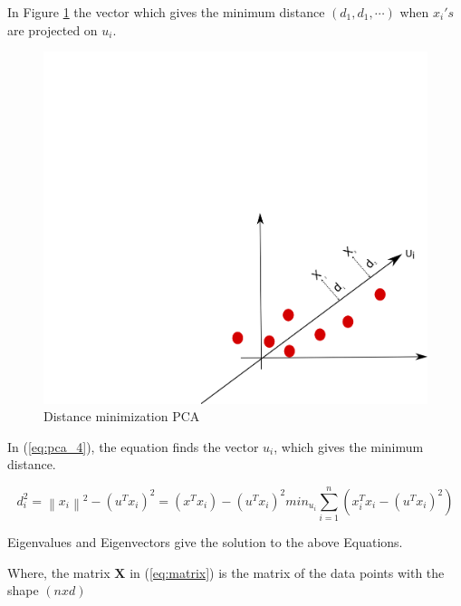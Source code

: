 In Figure \ref{fig:pca_step3} the vector which gives the minimum distance $(d_1,d_1, \cdots)$ when $x_i's$ are projected on $u_i$. 

\begin{figure}[H]
\centering
\includegraphics[scale=0.7]{imagens/pca3.png}
\caption{Distance minimization PCA}
\label{fig:pca_step3}
\end{figure}

In (\ref{eq:pca_4}), the equation finds the vector $u_i$, which gives the minimum distance. 

\begin{subequations}
    \label{eq:pca_4}
    \begin{equation}
        d_i^2 = \left \| x_i \right \|^2 - \left ( u^Tx_i \right )^2
    \end{equation}
    \begin{equation}
        = \left ( x^Tx_i \right ) - (u^Tx_i)^2
    \end{equation}
    \begin{equation}
        min_{u_i} \sum_{i=1}^{n}\left ( x_i^Tx_i - \left ( u^Tx_i \right )^2 \right )
    \end{equation}
\end{subequations}

Eigenvalues and Eigenvectors give the solution to the above Equations. 

Where, the matrix $\mathbf{X}$ in (\ref{eq:matrix}) is the matrix of the data points with the shape $(n x d)$

